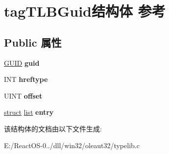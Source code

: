 \hypertarget{structtag_t_l_b_guid}{}\section{tag\+T\+L\+B\+Guid结构体 参考}
\label{structtag_t_l_b_guid}
\subsection*{Public 属性}
\begin{DoxyCompactItemize}
\item 
\mbox{\label{structtag_t_l_b_guid_a3a21fc427b661591ec5c961c9f633f2f}} 
\hyperlink{interface_g_u_i_d}{G\+U\+ID} {\bfseries guid}
\item 
\mbox{\label{structtag_t_l_b_guid_a96b0b5b75be79b3894e0d3dcb5b1aa5e}} 
I\+NT {\bfseries hreftype}
\item 
\mbox{\label{structtag_t_l_b_guid_a37a3c86ceaf1d1f757e3294533e78def}} 
U\+I\+NT {\bfseries offset}
\item 
\mbox{\label{structtag_t_l_b_guid_a3130d4db479aec4ad3e64a6fc78614fb}} 
\hyperlink{interfacestruct}{struct} \hyperlink{classlist}{list} {\bfseries entry}
\end{DoxyCompactItemize}


该结构体的文档由以下文件生成\+:\begin{DoxyCompactItemize}
\item 
E\+:/\+React\+O\+S-\/0../dll/win32/oleaut32/typelib.\+c\end{DoxyCompactItemize}
